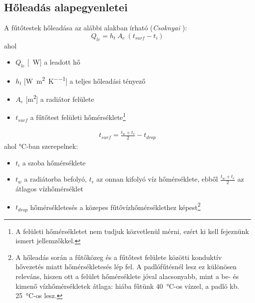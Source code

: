 

\subsection{Hőleadás alapegyenletei}
A fűtőtestek hőleadása az alábbi alakban írható (\textit{Csoknyai} \cite[358.~o.]{Herz}):
\begin{equation} \label{eq_holeadas}
 Q_{le} = h_t ~ A_e ~ (t_{surf} - t_i)
\end{equation}
ahol
\begin{itemize}[itemsep=6pt,topsep=0pt,parsep=0pt,partopsep=0pt]
\item[] ${Q}_{le}$ [\SI{}{\watt}] a leadott hő
\item[] $h_t$ [\si[per-mode = fraction]{\watt\per\meter\squared\per\kelvin}] a teljes hőleadási tényező %
\item[] $A_e$ [\si{\metre\squared}] a radiátor felülete
\item[] $t_{surf}$ a fűtőtest felületi hőmérséklete\footnote{A felületi hőmérsékletet nem tudjuk közvetlenül mérni, ezért ki kell fejeznünk ismert jellemzőkkel.}
\end{itemize}
\begin{equation} \label{eq_termeszeteshk_359}
\begin{aligned}
t_{surf} = \frac{t_w+t_r}{2} -t_{drop}
\end{aligned}
\end{equation}
ahol \si{\celsius}-ban szerepelnek:
\begin{itemize}[itemsep=6pt,topsep=0pt,parsep=0pt,partopsep=0pt]
	\item[] $t_i$ a szoba hőmérséklete
	\item[] $t_w$ a radiátorba befolyó, $t_r$ az onnan kifolyó víz hőmérséklete, ebből $\frac{t_w+t_r}{2}$ az átlagos vízhőmérséklet
	\item[] $t_{drop}$ hőmérsékletesés a közepes fűtővízhőmérséklethez képest\footnote{A hőleadás során a fűtőközeg és a fűtőtest felülete közötti konduktív hővezetés miatt hőmérsékletesés lép fel. A padlófűtésnél lesz ez különösen releváns, hiszen ott a felület hőmérséklete jóval alacsonyabb, mint a be- és kimenő vízhőmérsékletek átlaga: hiába fűtünk \SI{40}{\celsius}-os vízzel, a padló kb. \SI{25}{\celsius}-os lesz.}
\end{itemize}
